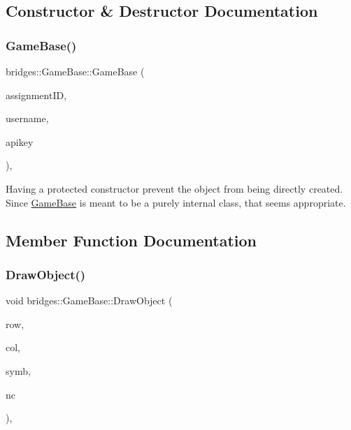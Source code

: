 \subsection{Constructor \& Destructor Documentation}
\mbox{\label{classbridges_1_1_game_base_a6c67b1c0ff17220a623217d5b053ba9b}} 
\subsubsection{\texorpdfstring{GameBase()}{GameBase()}}
{\footnotesize\ttfamily bridges\+::\+Game\+Base\+::\+Game\+Base (\begin{DoxyParamCaption}\item[{int}]{assignment\+ID,  }\item[{std\+::string}]{username,  }\item[{std\+::string}]{apikey }\end{DoxyParamCaption})\hspace{0.3cm}{\ttfamily [inline]}, {\ttfamily [protected]}}

Having a protected constructor prevent the object from being directly created. Since \mbox{\hyperlink{classbridges_1_1_game_base}{Game\+Base}} is meant to be a purely internal class, that seems appropriate. 

\subsection{Member Function Documentation}
\mbox{\label{classbridges_1_1_game_base_a40b48b30c466601638917f037dfadd67}} 
\subsubsection{\texorpdfstring{DrawObject()}{DrawObject()}}
{\footnotesize\ttfamily void bridges\+::\+Game\+Base\+::\+Draw\+Object (\begin{DoxyParamCaption}\item[{int}]{row,  }\item[{int}]{col,  }\item[{\mbox{\hyperlink{namespacebridges_acfb0a4f7877d8f63de3e6862004c50ed}{Named\+Symbol}}}]{symb,  }\item[{\mbox{\hyperlink{namespacebridges_ad811207d8898a7fd6b72a74725e68357}{Named\+Color}}}]{nc }\end{DoxyParamCaption})\hspace{0.3cm}{\ttfamily [inline]}, {\ttfamily [protected]}}

